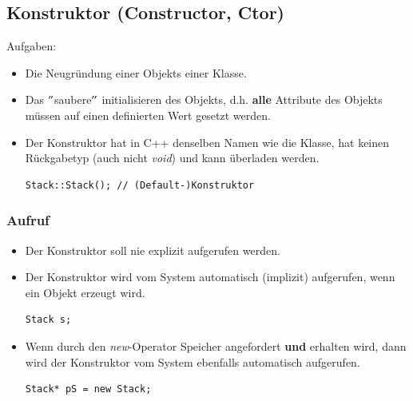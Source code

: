 \subsection{Konstruktor (Constructor, Ctor)}
Aufgaben:
\begin{itemize}
	\item Die Neugründung einer Objekts einer Klasse.
	\item Das $"$saubere$"$ initialisieren des Objekts, d.h. \textbf{alle} Attribute des Objekts müssen auf einen definierten Wert gesetzt werden.
	\item Der Konstruktor hat in C++ denselben Namen wie die Klasse, hat keinen Rückgabetyp (auch nicht \emph{void}) und kann überladen werden.\\
	\vspace{-\baselineskip}
	\begin{minipage}{0.55\linewidth}
\begin{lstlisting}
Stack::Stack();	// (Default-)Konstruktor
\end{lstlisting}
	\end{minipage}
\end{itemize}

\subsubsection{Aufruf}
\label{sec:aufruf}
\begin{itemize}
	\item Der Konstruktor soll nie explizit aufgerufen werden.
	\item Der Konstruktor wird vom System automatisch (implizit) aufgerufen, wenn ein Objekt erzeugt wird.\\
	\vspace{-\baselineskip}
	\begin{minipage}{0.15\linewidth}
\begin{lstlisting}
Stack s;
\end{lstlisting}
	\end{minipage}
	\item Wenn durch den \emph{new}-Operator Speicher angefordert \textbf{und} erhalten wird, dann wird der Konstruktor vom System ebenfalls automatisch aufgerufen.\\
	\vspace{-\baselineskip}
	\begin{minipage}{0.3\linewidth}
\begin{lstlisting}
Stack* pS = new Stack;
\end{lstlisting}
	\end{minipage}
\end{itemize}

